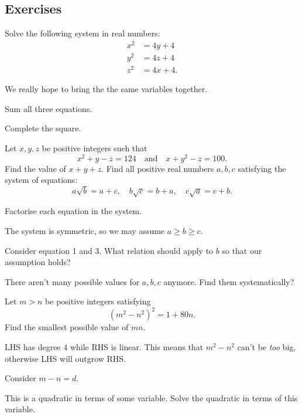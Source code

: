 \documentclass[../jarvis.tex]{subfiles}
\begin{document}
\subsection{Exercises}
\problem[2014 SMO(S) P29]Solve the following system in real numbers:
\begin{align*}
    x^2&=4y+4 \\
    y^2&=4z+4 \\
    z^2&=4x+4.
\end{align*}
\begin{hints}
    \begin{hint}
        We really hope to bring the the same variables together.
    \end{hint}
    \begin{hint}
        Sum all three equations.
    \end{hint}
    \begin{hint}
        Complete the square.
    \end{hint}
\end{hints}
\problem[2016 SMO(J) P28]Let $x,y,z$ be positive integers such that
$$x^2+y-z=124\quad\text{and}\quad x+y^2-z=100.$$
Find the value of $x+y+z$.
\problem[2014 SMO(S) R2/2]Find all positive real numbers $a,b,c$ satisfying the system of equations:
$$a\sqrt{b}=a+c,\quad b\sqrt{c}=b+a,\quad c\sqrt{a}=c+b.$$
\begin{hints}
    \begin{hint}
        Factorise each equation in the system.
    \end{hint}
    \begin{hint}
        The system is symmetric, so we may assume $a\geq b\geq c$.
    \end{hint}
    \begin{hint}
        Consider equation 1 and 3. What relation should apply to $b$ so that our assumption holds? 
    \end{hint}
    \begin{hint}
        There aren't many possible values for $a,b,c$ anymore. Find them systematically?
    \end{hint}
\end{hints}
\problem[2020 SMO(J) P24]Let $m>n$ be positive integers satisfying
$$(m^2-n^2)^2=1+80n.$$
Find the smallest possible value of $mn$.
\begin{hints}
    \begin{hint}
        LHS has degree $4$ while RHS is linear. This means that $m^2-n^2$ can't be \textit{too} big, otherwise LHS will outgrow RHS.
    \end{hint}
    \begin{hint}
        Consider $m-n=d$.
    \end{hint}
    \begin{hint}
        This is a quadratic in terms of some variable. Solve the quadratic in terms of this variable.
    \end{hint}
\end{hints}
\end{document}
